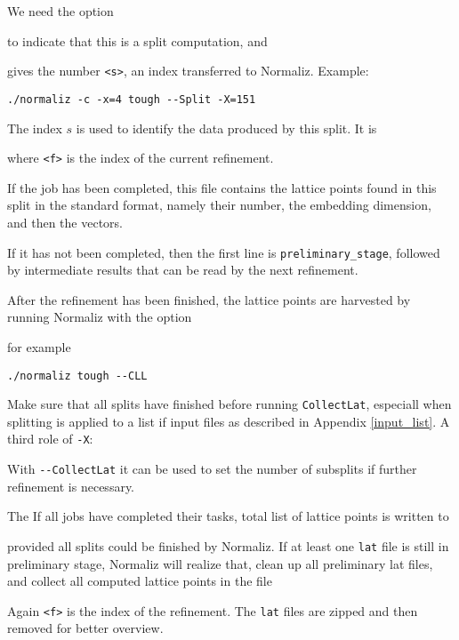 We need the option
\begin{itemize}
\end{itemize}
to indicate that this is a split computation, and 
\begin{itemize}
\end{itemize}
gives the number \verb*|<s>|, an index transferred to Normaliz. Example:
\begin{Verbatim}
./normaliz -c -x=4 tough --Split -X=151
\end{Verbatim}

The index $s$ is used to identify the data produced by this split. It is
\begin{itemize}
\end{itemize}
where \verb|<f>| is the index of the current refinement. 

If the job has been completed, this file contains the lattice points found in this split in the standard format, namely their number, the embedding dimension, and then the vectors. 

If it has not been completed, then the first line is \verb|preliminary_stage|, followed by intermediate results that can be read by the next refinement.

After the refinement has been finished, the lattice points are harvested by running Normaliz with the option
\begin{itemize}
\end{itemize}
for example
\begin{Verbatim}
./normaliz tough --CLL
\end{Verbatim}
Make sure that all splits have finished before running \verb*|CollectLat|, especiall when splitting is applied to a list if input files as described in Appendix \ref{input_list}. A third role of \verb*|-X|:
\begin{itemize}
\end{itemize}
With \verb*|--CollectLat| it can be used to set the number of subsplits if further refinement is necessary.

The If all jobs have completed their tasks, total list of lattice points is written to
\begin{itemize}
\end{itemize}
provided all splits could be finished by Normaliz. If at least one \verb|lat| file is still in preliminary stage, Normaliz will realize that, clean up all preliminary lat files, and collect all computed lattice points in the file
\begin{itemize}
\end{itemize}
Again \verb*|<f>| is the index of the refinement. The \verb*|lat| files are zipped and then removed for better overview.

